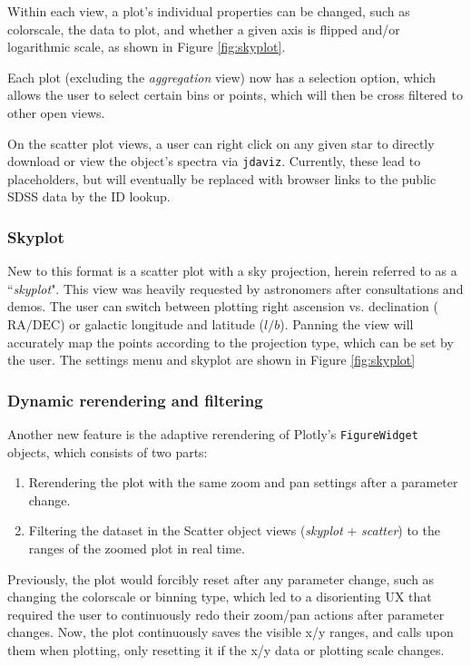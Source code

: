 \documentclass[a4paper,10pt,twocolumn]{article}
\begin{document}
Within each view, a plot's individual properties can be changed, such as colorscale, the data to plot, and whether a given axis is flipped and/or logarithmic scale, as shown in Figure \ref{fig:skyplot}.

Each plot (excluding the \emph{aggregation} view) now has a selection option, which allows the user to select certain bins or points, which will then be cross filtered to other open views.

On the scatter plot views, a user can right click on any given star to directly download or view the object's spectra via \texttt{jdaviz}. Currently, these lead to placeholders, but will eventually be replaced with browser links to the public SDSS data by the ID lookup.

\subsubsection{Skyplot}
\label{sec:skyplot}
New to this format is a scatter plot with a sky projection, herein referred to as a ``\emph{skyplot}". This view was heavily requested by astronomers after consultations and demos. The user can switch between plotting right ascension vs. declination ($\mathrm{RA / DEC} $) or galactic longitude and latitude ($l / b $). Panning the view will accurately map the points according to the projection type, which can be set by the user. The settings menu and skyplot are shown in Figure \ref{fig:skyplot}


\subsubsection{Dynamic rerendering and filtering}
\label{sec:rerender}
Another new feature is the adaptive rerendering of Plotly's \texttt{FigureWidget} objects, which consists of two parts:
\begin{enumerate}
	\item Rerendering the plot with the same zoom and pan settings after a parameter change.
	\item Filtering the dataset in the Scatter object views (\emph{skyplot} + \emph{scatter}) to the ranges of the zoomed plot in real time.
\end{enumerate}

Previously, the plot would forcibly reset after any parameter change, such as changing the colorscale or binning type, which led to a disorienting UX that required the user to continuously redo their zoom/pan actions after parameter changes. Now, the plot continuously saves the visible x/y ranges, and calls upon them when plotting, only resetting it if the x/y data or plotting scale changes.
\end{document}
